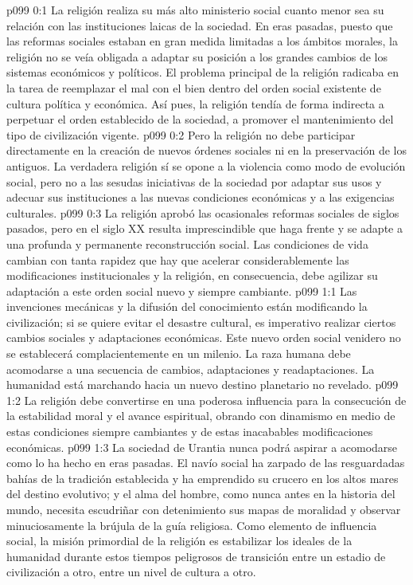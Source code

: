 \author{Melquisedec}
\vs p099 0:1 La religión realiza su más alto ministerio social cuanto menor sea su relación con las instituciones laicas de la sociedad. En eras pasadas, puesto que las reformas sociales estaban en gran medida limitadas a los ámbitos morales, la religión no se veía obligada a adaptar su posición a los grandes cambios de los sistemas económicos y políticos. El problema principal de la religión radicaba en la tarea de reemplazar el mal con el bien dentro del orden social existente de cultura política y económica. Así pues, la religión tendía de forma indirecta a perpetuar el orden establecido de la sociedad, a promover el mantenimiento del tipo de civilización vigente.
\vs p099 0:2 Pero la religión no debe participar directamente en la creación de nuevos órdenes sociales ni en la preservación de los antiguos. La verdadera religión sí se opone a la violencia como modo de evolución social, pero no a las sesudas iniciativas de la sociedad por adaptar sus usos y adecuar sus instituciones a las nuevas condiciones económicas y a las exigencias culturales.
\vs p099 0:3 La religión aprobó las ocasionales reformas sociales de siglos pasados, pero en el siglo XX resulta imprescindible que haga frente y se adapte a una profunda y permanente reconstrucción social. Las condiciones de vida cambian con tanta rapidez que hay que acelerar considerablemente las modificaciones institucionales y la religión, en consecuencia, debe agilizar su adaptación a este orden social nuevo y siempre cambiante.
\vs p099 1:1 Las invenciones mecánicas y la difusión del conocimiento están modificando la civilización; si se quiere evitar el desastre cultural, es imperativo realizar ciertos cambios sociales y adaptaciones económicas. Este nuevo orden social venidero no se establecerá complacientemente en un milenio. La raza humana debe acomodarse a una secuencia de cambios, adaptaciones y readaptaciones. La humanidad está marchando hacia un nuevo destino planetario no revelado.
\vs p099 1:2 \pc La religión debe convertirse en una poderosa influencia para la consecución de la estabilidad moral y el avance espiritual, obrando con dinamismo en medio de estas condiciones siempre cambiantes y de estas inacabables modificaciones económicas.
\vs p099 1:3 \pc La sociedad de Urantia nunca podrá aspirar a acomodarse como lo ha hecho en eras pasadas. El navío social ha zarpado de las resguardadas bahías de la tradición establecida y ha emprendido su crucero en los altos mares del destino evolutivo; y el alma del hombre, como nunca antes en la historia del mundo, necesita escudriñar con detenimiento sus mapas de moralidad y observar minuciosamente la brújula de la guía religiosa. Como elemento de influencia social, la misión primordial de la religión es estabilizar los ideales de la humanidad durante estos tiempos peligrosos de transición entre un estadio de civilización a otro, entre un nivel de cultura a otro.
